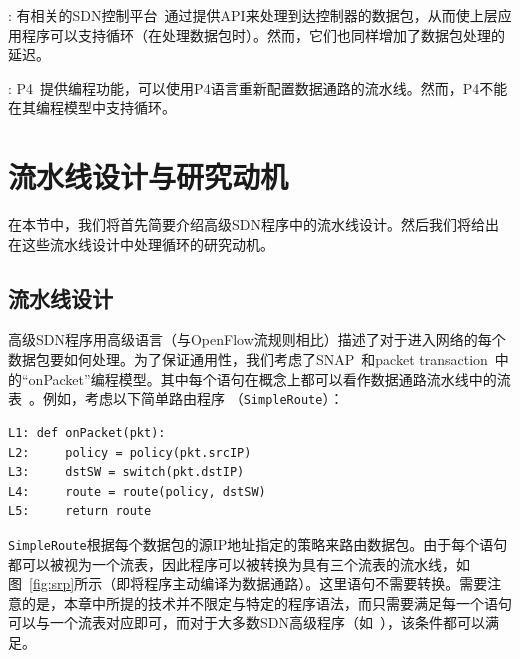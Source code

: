 : 有相关的SDN控制平台~\cite{odl,erickson2013beacon,gude2008nox,floodlight}通过提供API来处理到达控制器的数据包，从而使上层应用程序可以支持循环（在处理数据包时）。然而，它们也同样增加了数据包处理的延迟。

: P4~\cite{P4}提供编程功能，可以使用P4语言重新配置数据通路的流水线。然而，P4不能在其编程模型中支持循环。


\section{流水线设计与研究动机}
\label{sec:motivation}

在本节中，我们将首先简要介绍高级SDN程序中的流水线设计。然后我们将给出在这些流水线设计中处理循环的研究动机。

\subsection{流水线设计}
高级SDN程序用高级语言（与OpenFlow流规则相比）描述了对于进入网络的每个数据包要如何处理。为了保证通用性，我们考虑了SNAP~\cite{snap}和packet transaction~\cite{sivaraman2016packet}中的``onPacket''编程模型。其中每个语句在概念上都可以看作数据通路流水线中的流表~\cite{snap,sivaraman2016packet}。例如，考虑以下简单路由程序 （\texttt{SimpleRoute}）：

\begin{small}
\begin{verbatim}
L1: def onPacket(pkt):
L2:     policy = policy(pkt.srcIP)
L3:     dstSW = switch(pkt.dstIP)
L4:     route = route(policy, dstSW)
L5:     return route
\end{verbatim}
\end{small}

\texttt{SimpleRoute}根据每个数据包的源IP地址指定的策略来路由数据包。由于每个语句都可以被视为一个流表，因此程序可以被转换为具有三个流表的流水线，如图~\ref{fig:srp}所示（即将程序主动编译为数据通路）。这里语句不需要转换。需要注意的是，本章中所提的技术并不限定与特定的程序语法，而只需要满足每一个语句可以与一个流表对应即可，而对于大多数SDN高级程序（如~\cite{snap,sivaraman2016packet}），该条件都可以满足。

